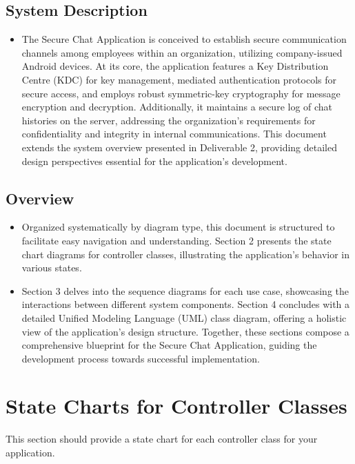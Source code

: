 \documentclass[]{article}
\begin{document}
\subsection{System Description}
\label{sub:system_description}
\begin{itemize}
    \item The Secure Chat Application is conceived to establish secure communication channels among employees within an organization, utilizing company-issued Android devices. At its core, the application features a Key Distribution Centre (KDC) for key management, mediated authentication protocols for secure access, and employs robust symmetric-key cryptography for message encryption and decryption. Additionally, it maintains a secure log of chat histories on the server, addressing the organization's requirements for confidentiality and integrity in internal communications. This document extends the system overview presented in Deliverable 2, providing detailed design perspectives essential for the application's development.
\end{itemize}

\subsection{Overview}
\label{sub:overview}
\begin{itemize}
    \item Organized systematically by diagram type, this document is structured to facilitate easy navigation and understanding. Section 2 presents the state chart diagrams for controller classes, illustrating the application's behavior in various states.
    \item Section 3 delves into the sequence diagrams for each use case, showcasing the interactions between different system components. Section 4 concludes with a detailed Unified Modeling Language (UML) class diagram, offering a holistic view of the application's design structure. Together, these sections compose a comprehensive blueprint for the Secure Chat Application, guiding the development process towards successful implementation.
\end{itemize}



\section{State Charts for Controller Classes}
\label{sec:state_charts_for_controller_classes}
This section should provide a state chart for each controller class for your application.
\end{document}
